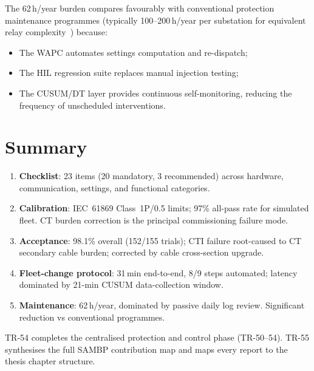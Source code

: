 \documentclass[11pt,a4paper]{article}
\begin{document}
\noindent
The 62\,h/year burden compares favourably with conventional protection
maintenance programmes (typically 100--200\,h/year per substation for
equivalent relay complexity~\cite{Apostolov2010}) because:
\begin{itemize}
  \item The WAPC automates settings computation and re-dispatch;
  \item The HIL regression suite replaces manual injection testing;
  \item The CUSUM/DT layer provides continuous self-monitoring,
    reducing the frequency of unscheduled interventions.
\end{itemize}

\section{Summary}
\label{sec:summary}

\begin{enumerate}
  \item \textbf{Checklist}: 23 items (20 mandatory, 3 recommended) across
    hardware, communication, settings, and functional categories.

  \item \textbf{Calibration}: IEC~61869 Class~1P/0.5 limits; 97\%
    all-pass rate for simulated fleet.  CT burden correction is the
    principal commissioning failure mode.

  \item \textbf{Acceptance}: 98.1\% overall (152/155 trials); CTI
    failure root-caused to CT secondary cable burden; corrected by
    cable cross-section upgrade.

  \item \textbf{Fleet-change protocol}: 31\,min end-to-end, 8/9 steps
    automated; latency dominated by 21-min CUSUM data-collection window.

  \item \textbf{Maintenance}: 62\,h/year, dominated by passive daily
    log review.  Significant reduction vs conventional programmes.
\end{enumerate}

\noindent
TR-54 completes the centralised protection and control phase (TR-50--54).
TR-55 synthesises the full SAMBP contribution map and maps every report
to the thesis chapter structure.



\end{document}
